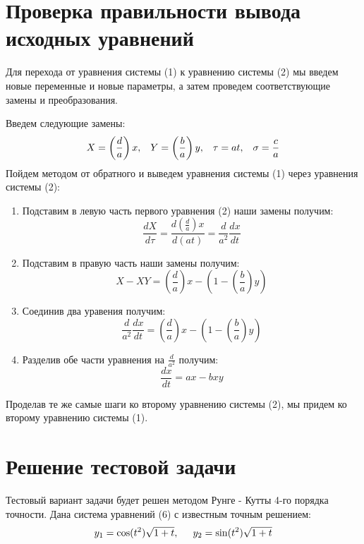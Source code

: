 \documentclass[a4paper,12pt]{article}
\begin{document}
\section{Проверка правильности вывода исходных уравнений}
\hspace{0.5cm} Для перехода от уравнения системы (1) к уравнению системы (2) мы введем новые переменные и новые параметры,
а затем проведем соответствующие замены и преобразования.

Введем следующие замены: 
\begin{equation}
    X = \left(\frac{d}{a}\right)x, \hspace{0.3cm} Y = \left(\frac{b}{a}\right)y, \hspace{0.3cm} \tau = at, \hspace{0.3cm} \sigma = \frac{c}{a}
\end{equation}
\hspace{0.5cm} Пойдем методом от обратного и выведем уравнения системы (1) через уравнения системы (2):
\begin{enumerate}
    \item Подставим в левую часть первого уравнения (2) наши замены получим:
    $$ \frac{dX}{d\tau} = \frac{d\left(\frac{d}{a}\right)x}{d(at)} = \frac{d}{a^2} \frac{dx}{dt} $$
    \item Подставим в правую часть наши замены получим: 
    $$ X - XY = \left(\frac{d}{a}\right)x - \left(1 - \left(\frac{b}{a}\right)y\right) $$
    \item Соединив два уравения получим:
    $$ \frac{d}{a^2} \frac{dx}{dt} = \left(\frac{d}{a}\right)x - \left(1 - \left(\frac{b}{a}\right)y\right) $$
    \item Разделив обе части уравнения на $\frac{d}{a^2}$ получим:
    $$ \frac{dx}{dt} = ax - bxy $$ 
\end{enumerate}

Проделав те же самые шаги ко второму уравнению системы (2), мы придем ко второму уравнению системы (1).

\newpage
\section{Решение тестовой задачи}
\hspace{0.5cm} Тестовый вариант задачи будет решен методом Рунге - Кутты 4-го порядка точности.
Дана система уравнений (6) с известным точным решением:
\begin{equation}
    y_1 = \cos(t^2)\sqrt{1 + t}, \hspace{0.5cm} y_2 = \sin(t^2)\sqrt{1 + t}
\end{equation}
\end{document}
